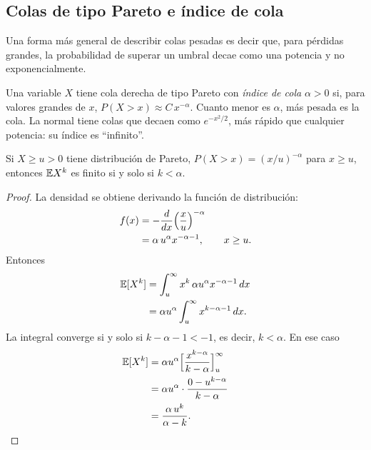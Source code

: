 \subsection{Colas de tipo Pareto e índice de cola}

Una forma más general de describir colas pesadas es decir que, para pérdidas grandes, la probabilidad de
superar un umbral decae como una potencia y no exponencialmente.

\begin{definicion}
Una variable $X$ tiene cola derecha de tipo Pareto con \emph{índice de cola} $\alpha>0$ si, para valores
grandes de $x$, $P(X>x)\approx C\,x^{-\alpha}$. Cuanto menor es $\alpha$, más pesada es la cola. La normal
tiene colas que decaen como $e^{-x^2/2}$, más rápido que cualquier potencia: su índice es ``infinito''.
\end{definicion}

\begin{proposicion}\label{prop:momentos_cola}
Si $X\ge u>0$ tiene distribución de Pareto, $P(X>x)=(x/u)^{-\alpha}$ para $x\ge u$, entonces $\mathbb{E} X^k$ es
finito si y solo si $k<\alpha$.
\end{proposicion}

\begin{proof}
La densidad se obtiene derivando la función de distribución:
\begin{align*}
  f(x) &= -\frac{d}{dx}\Bigl(\frac{x}{u}\Bigr)^{-\alpha}\\
       &= \alpha\,u^{\alpha}x^{-\alpha-1}, \qquad x\ge u .
\end{align*}
Entonces
\begin{align*}
  \mathbb{E}[X^k] &= \int_u^\infty x^k\,\alpha u^{\alpha}x^{-\alpha-1}\,dx\\
          &= \alpha u^{\alpha}\int_u^\infty x^{k-\alpha-1}\,dx .
\end{align*}
La integral converge si y solo si $k-\alpha-1<-1$, es decir, $k<\alpha$. En ese caso
\begin{align*}
  \mathbb{E}[X^k] &= \alpha u^{\alpha}\Bigl[\frac{x^{k-\alpha}}{k-\alpha}\Bigr]_u^\infty\\
          &= \alpha u^{\alpha}\cdot\frac{0-u^{k-\alpha}}{k-\alpha}\\
          &= \frac{\alpha\,u^{k}}{\alpha-k}. && \qedhere
\end{align*}
\end{proof}

